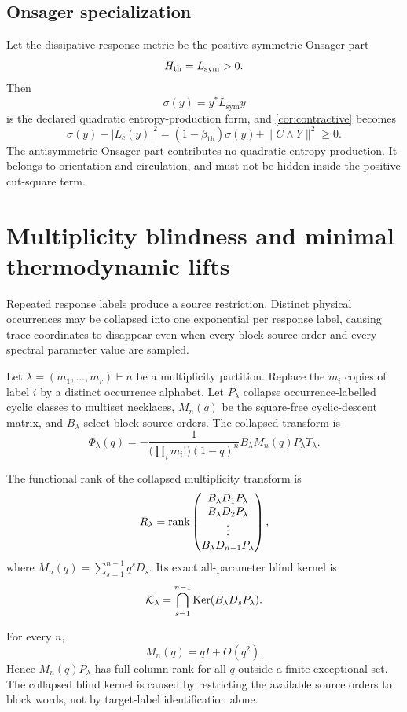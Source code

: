 \subsection{Onsager specialization}

Let the dissipative response metric be the positive symmetric Onsager part
\[
 H_{\mathrm{th}}=L_{\mathrm{sym}}>0.
\]
Then
\[
 \sigma(y)=y^*L_{\mathrm{sym}}y
\]
is the declared quadratic entropy-production form, and \cref{cor:contractive} becomes
\[
 \sigma(y)-|L_c(y)|^2
 =(1-\beta_{\mathrm{th}})\sigma(y)+\|C\wedge Y\|^2\ge0.
\]
The antisymmetric Onsager part contributes no quadratic entropy production. It belongs to orientation and circulation, and must not be hidden inside the positive cut-square term.

\section{Multiplicity blindness and minimal thermodynamic lifts}

Repeated response labels produce a source restriction. Distinct physical occurrences may be collapsed into one exponential per response label, causing trace coordinates to disappear even when every block source order and every spectral parameter value are sampled.

Let $\lambda=(m_1,\ldots,m_r)\vdash n$ be a multiplicity partition. Replace the $m_i$ copies of label $i$ by a distinct occurrence alphabet. Let $P_\lambda$ collapse occurrence-labelled cyclic classes to multiset necklaces, $M_n(q)$ be the square-free cyclic-descent matrix, and $B_\lambda$ select block source orders. The collapsed transform is
\[
 \Phi_\lambda(q)
 =-\frac{1}{\bigl(\prod_i m_i!\bigr)(1-q)^n}
 B_\lambda M_n(q)P_\lambda T_\lambda.
\]

\begin{theorem}
The functional rank of the collapsed multiplicity transform is
\[
 R_\lambda=\operatorname{rank}
 \begin{pmatrix}
 B_\lambda D_1P_\lambda\\
 B_\lambda D_2P_\lambda\\
 \vdots\\
 B_\lambda D_{n-1}P_\lambda
 \end{pmatrix},
\]
where $M_n(q)=\sum_{s=1}^{n-1}q^sD_s$. Its exact all-parameter blind kernel is
\[
 \mathcal K_\lambda
 =\bigcap_{s=1}^{n-1}\operatorname{Ker}(B_\lambda D_sP_\lambda).
\]
\end{theorem}

\begin{theorem}
For every $n$,
\[
 M_n(q)=qI+O(q^2).
\]
Hence $M_n(q)P_\lambda$ has full column rank for all $q$ outside a finite exceptional set. The collapsed blind kernel is caused by restricting the available source orders to block words, not by target-label identification alone.
\end{theorem}

